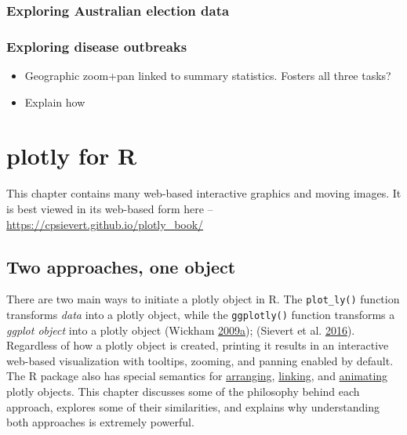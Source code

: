 \documentclass[12pt,]{isuthesis}
\providecommand{\tightlist}{%
  \setlength{\itemsep}{0pt}\setlength{\parskip}{0pt}}
\begin{document}
\subsection{Exploring Australian election
data}\label{exploring-australian-election-data}

\subsection{Exploring disease
outbreaks}\label{exploring-disease-outbreaks}

\begin{itemize}
\tightlist
\item
  Geographic zoom+pan linked to summary statistics. Fosters all three
  tasks?
\item
  Explain how
\end{itemize}

\chapter{plotly for R}

This chapter contains many web-based interactive graphics and moving
images. It is best viewed in its web-based form here --
\url{https://cpsievert.github.io/plotly_book/}

\section{Two approaches, one object}\label{two-approaches-one-object}

There are two main ways to initiate a plotly object in R. The
\texttt{plot\_ly()} function transforms \emph{data} into a plotly
object, while the \texttt{ggplotly()} function transforms a \emph{ggplot
object} into a plotly object (Wickham
\protect\hyperlink{ref-ggplot2}{2009}\protect\hyperlink{ref-ggplot2}{a});
(Sievert et al. \protect\hyperlink{ref-plotly}{2016}). Regardless of how
a plotly object is created, printing it results in an interactive
web-based visualization with tooltips, zooming, and panning enabled by
default. The R package also has special semantics for
\protect\hyperlink{arranging-multiple-views}{arranging},
\protect\hyperlink{multiple-linked-views}{linking}, and
\protect\hyperlink{animating-views}{animating} plotly objects. This
chapter discusses some of the philosophy behind each approach, explores
some of their similarities, and explains why understanding both
approaches is extremely powerful.
\end{document}
